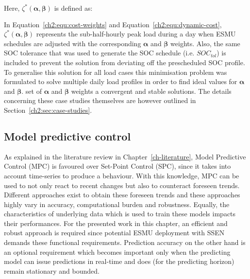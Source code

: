 

Here, $\zeta^*(\boldsymbol{\alpha}, \boldsymbol{\beta})$ is defined as:



In Equation~\ref{ch2:equ:cost-weights} and Equation~\ref{ch2:equ:dynamic-cost}, $\zeta^*(\boldsymbol{\alpha}, \boldsymbol{\beta})$ represents the sub-half-hourly peak load during a day when ESMU schedules are adjusted with the corresponding $\boldsymbol{\alpha}$ and $\boldsymbol{\beta}$ weights.
Also, the same SOC tolerance that was used to generate the SOC schedule (i.e. $SOC_{tol}$) is included to prevent the solution from deviating off the prescheduled SOC profile.
To generalise this solution for all load cases this minimisation problem was formulated to solve multiple daily load profiles in order to find ideal values for $\boldsymbol{\alpha}$ and $\boldsymbol{\beta}$.
 set of $\boldsymbol{\alpha}$ and $\boldsymbol{\beta}$ weights  a convergent and stable solutions.
The details concerning these case studies themselves are however outlined in Section~\ref{ch2:sec:case-studies}.

\subsection{Model predictive control}

As explained in the literature review in Chapter~\ref{ch-literature}, Model Predictive Control (MPC) is favoured over Set-Point Control (SPC), since it takes into account time-series to produce a behaviour.
With this knowledge, MPC can be used to not only react to recent changes but also to counteract foreseen trends.
Different approaches exist to obtain these foreseen trends and these approaches highly vary in accuracy, computational burden and robustness.
Equally, the characteristics of underlying data which is used to train these models impacts their performances.
For the presented work in this chapter, an efficient and robust approach is required since potential ESMU deployment with SSEN demands these functional requirements.
Prediction accuracy on the other hand is an optional requirement which becomes important only when the predicting model can issue predictions in real-time and does (for the predicting horizon) remain stationary and bounded.

